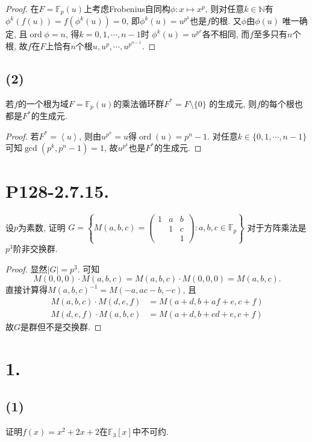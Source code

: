 \documentclass[12pt, a4paper, fontset=windows]{ctexart}
\newcommand{\F}{\mathbb{F}}
\newcommand{\N}{\mathbb{N}}
\newcommand{\abs}[1]{\left|{#1}\right|}
\newcommand{\gen}[1]{\left\langle{#1}\right\rangle}
\newcommand{\ord}{\operatorname{ord}}
\def\pmat#1{\begin{pmatrix}#1\end{pmatrix}}
\begin{document}
\begin{proof}
在$F=\F_p(u)$上考虑Frobenius自同构$\phi:x\mapsto x^p$, 
则对任意$k\in\N$有$\phi^k(f(u))=f(\phi^k(u))=0$, 
即$\phi^k(u)=u^{p^k}$也是$f$的根. 又$\phi$由$\phi(u)$
唯一确定, 且$\ord\phi=n$, 得$k=0,1,\cdots,n-1$时
$\phi^k(u)=u^{p^k}$各不相同, 而$f$至多只有$n$个根, 
故$f$在$F$上恰有$n$个根$u,u^p,\cdots,u^{p^{n-1}}$. 
\end{proof}

\subsection*{(2)}

若$f$的一个根为域$F=\F_p(u)$的乘法循环群$F^*=F\setminus\{0\}$
的生成元, 则$f$的每个根也都是$F^*$的生成元. 

\begin{proof}
若$F^*=\gen{u}$, 则由$u^{p^n}=u$得$\ord(u)=p^n-1$. 
对任意$k\in\{0,1,\cdots,n-1\}$可知$\gcd(p^k,p^n-1)=1$, 
故$u^{p^k}$也是$F^*$的生成元. 
\end{proof}

\section*{P128-2.7.15.}

设$p$为素数, 证明
$G=\left\{M(a,b,c)=\pmat{1&a&b\\&1&c\\&&1}:a,b,c\in\F_p\right\}$
对于方阵乘法是$p^3$阶非交换群. 

\begin{proof}
显然$\abs{G}=p^3$. 可知
\[M(0,0,0)\cdot M(a,b,c)=M(a,b,c)\cdot M(0,0,0)=M(a,b,c).\]
直接计算得$M(a,b,c)^{-1}=M(-a,ac-b,-c)$, 且
\begin{align*}
M(a,b,c)\cdot M(d,e,f)&=M(a+d,b+af+e,c+f)\\
M(d,e,f)\cdot M(a,b,c)&=M(a+d,b+cd+e,c+f)
\end{align*}
故$G$是群但不是交换群. 
\end{proof}

\section*{1.}

\subsection*{(1)}

证明$f(x)=x^2+2x+2$在$\F_3[x]$中不可约. 
\end{document}
